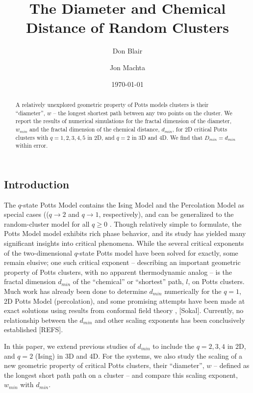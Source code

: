\documentclass[pre,preprint]{revtex4}
\begin{document}
\title{The Diameter and Chemical Distance of Random Clusters}

\author{Don Blair}
\author{Jon Machta}

\date{\today}


 \begin{abstract}
  A relatively unexplored geometric property of Potts models clusters is their ``diameter'', $w$ -- the longest shortest path between any two points on the cluster. We report the results of numerical simulations for the fractal dimension of the diameter, $w_{min}$ and the fractal dimension of the chemical distance, $d_{min}$, for 2D critical Potts clusters with $q=1,2,3,4,5$ in 2D, and $q=2$ in 3D and 4D. We find that $D_{min} = d_{min}$ within error.
 \end{abstract}

\maketitle 
\subsection{Introduction}
The  $q$-state Potts Model \cite{Po52} contains the Ising Model and the Percolation Model as special cases (($q \to 2$ and $q \to 1$, respectively), and can be generalized to the random-cluster model for all $q \ge 0$ \cite{FoKa}. Though relatively simple to formulate, the Potts Model model exhibits rich phase behavior, and its study has yielded many significant insights into critical phenomena.  While the several critical exponents of the two-dimensional  $q$-state Potts model have been solved for exactly, some remain elusive; one such critical exponent -- describing an important geometric property of Potts clusters, with no apparent thermodynamic analog -- is the fractal dimension $d_{min}$ of the ``chemical'' or ``shortest'' path, $l$, on Potts clusters.  Much work has already been done to determine $d_{min}$ numerically \cite{Gr83, HrSt88} for the $q=1$, 2D Potts Model (percolation), and some promising attempts have been made at exact solutions using results from conformal field theory \cite{Zi99}, [Sokal].  Currently, no relationship between the $d_{min}$ and other scaling exponents has been conclusively established [REFS].

In this paper, we extend previous studies of $d_{min}$ to include the $q=2,3,4$ in 2D, and $q=2$ (Ising) in 3D and 4D. For the systems, we also study the scaling of a new geometric property of critical Potts clusters, their ``diameter'', $w$ -- defined as the longest short path path on a cluster -- and compare this scaling exponent, $w_{min}$ with $d_{min}$.
\end{document}
